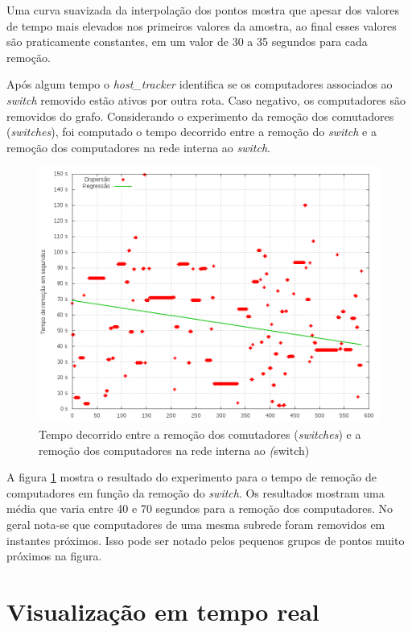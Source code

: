 Uma curva suavizada da interpolação dos pontos mostra que apesar dos valores
de tempo mais elevados nos primeiros valores da amostra, ao final esses valores
são praticamente constantes, em um valor de 30 a 35 segundos para cada 
remoção.

Após algum tempo o \emph{host\_tracker} identifica se os computadores 
associados ao \emph{switch} removido estão ativos por outra rota. 
Caso negativo, os computadores são removidos do grafo.
Considerando o experimento da remoção dos comutadores (\emph{switches}),
foi computado o tempo decorrido entre a remoção do \emph{switch} e a 
remoção dos computadores na rede interna ao \emph{switch}. 

\begin{figure}[h!]
    \centering
    \label{fig:hosts-behind-switch-time}
    \includegraphics[width=\linewidth]{img/hosts-behind-switch-time}
    \caption{Tempo decorrido entre a remoção dos comutadores 
    (\emph{switches}) e a remoção dos computadores na rede interna ao 
    \emph(switch)}
\end{figure}

A figura \ref{fig:hosts-behind-switch-time} mostra o resultado do experimento
para o tempo de remoção de computadores em função da remoção do 
\emph{switch}.
Os resultados mostram uma média que varia entre 40 e 70 segundos para a 
remoção dos computadores.
No geral nota-se que computadores de uma mesma subrede foram removidos em 
instantes próximos.
Isso pode ser notado pelos pequenos grupos de pontos muito próximos na 
figura.

\section{Visualização em tempo real}

